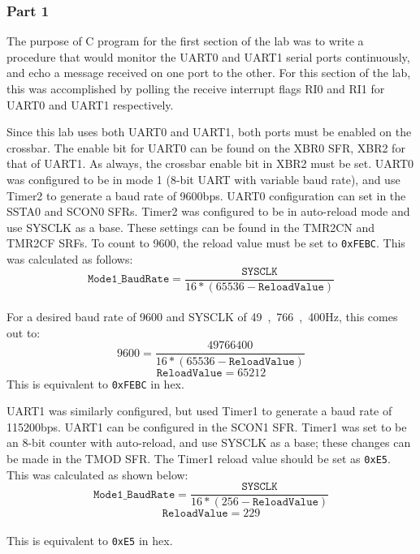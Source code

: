 \documentclass[12pt]{article}
\begin{document}
\subsubsection{Part 1}
The purpose of C program for the first section of the lab was to write a procedure that would monitor the UART0 and UART1 serial ports continuously, and echo a message received on one port to the other. For this section of the lab, this was accomplished by polling the receive interrupt flags RI0 and RI1 for UART0 and UART1 respectively. 

Since this lab uses both UART0 and UART1, both ports must be enabled on the crossbar. The enable bit for UART0 can be found on the XBR0 SFR, XBR2 for that of UART1. As always, the crossbar enable bit in XBR2 must be set. UART0 was configured to be in mode 1 (8-bit UART with variable baud rate), and use Timer2 to generate a baud rate of \si{9600}{bps}. UART0 configuration can set in the SSTA0 and SCON0 SFRs. Timer2 was configured to be in auto-reload mode and use SYSCLK as a base. These settings can be found in the TMR2CN and TMR2CF SRFs. To count to 9600, the reload value must be set to \texttt{0xFEBC}. This was calculated as follows:\\
\begin{equation}
	\mathtt{Mode1\_BaudRate} = \frac{\mathtt{SYSCLK}}{16*(65536-\mathtt{ReloadValue})}
\end{equation}\\
For a desired baud rate of 9600 and SYSCLK of \si{49,766,400}{Hz}, this comes out to:\\
\begin{equation}
9600= \frac{49766400}{16*(65536-\mathtt{ReloadValue})}
\end{equation}
\begin{equation}
\mathtt{ReloadValue} = 65212
\end{equation}
This is equivalent to \texttt{0xFEBC} in hex.

UART1 was similarly configured, but used Timer1 to generate a baud rate of \si{115200}{bps}. UART1 can be configured in the SCON1 SFR. Timer1 was set to be an 8-bit counter with auto-reload, and use SYSCLK as a base; these changes can be made in the TMOD SFR. The Timer1 reload value should be set as \texttt{0xE5}. This was calculated as shown below:\\ 
\begin{equation}
\mathtt{Mode1\_BaudRate} = \frac{\mathtt{SYSCLK}}{16*(256-\mathtt{ReloadValue})}
\end{equation}
\begin{equation}
\mathtt{ReloadValue} = 229
\end{equation}\\
This is equivalent to \texttt{0xE5} in hex.
\end{document}
